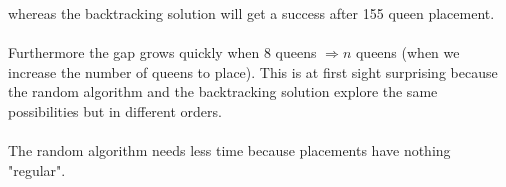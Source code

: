 \documentclass[11pt,a4paper]{scrartcl} %
\theoremstyle{definition}
\begin{document}
whereas the backtracking solution will get a success after 155 queen placement.
\paragraph{}
Furthermore the gap grows quickly when 8 queens $\Rightarrow n$ queens (when we increase the number of queens to place). This is at first sight surprising because the random algorithm and the backtracking solution explore the same possibilities but in different orders.
\paragraph{}
The random algorithm needs less time because placements have nothing "regular".

\end{document}
